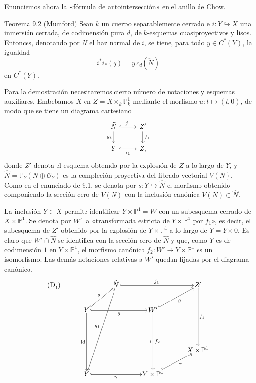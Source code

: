 Enunciemos ahora la «fórmula de autointersección» en el anillo de Chow.

\begin{statement}{Teorema 9.2 (Mumford)}
Sean $k$ un cuerpo separablemente cerrado e $i:Y\hookrightarrow X$ una inmersión cerrada, de codimensión pura $d$, de $k$-esquemas cuasiproyectivos y lisos. Entonces, denotando por $N$ el haz normal de $i$, se tiene, para todo $y\in C^*(Y)$, la igualdad
\[
i^*i_*(y)=y\,c_d(\check N)
\]
en $C^*(Y)$.
\end{statement}

Para la demostración necesitaremos cierto número de notaciones y esquemas auxiliares. Embebamos $X$ en $Z=X\times_k\mathbb P^1_k$ mediante el morfismo $u:t\mapsto(t,0)$, de modo que se tiene un diagrama cartesiano
\[
\begin{tikzcd}
\widehat N \arrow[r,hook,"j_1"] \arrow[d,"g_1"'] & Z' \arrow[d,"f_1"]\\
Y \arrow[r,hook,"i_1"'] & Z ,
\end{tikzcd}
\]
donde $Z'$ denota el esquema obtenido por la explosión de $Z$ a lo largo de $Y$, y $\widehat N=\mathbb P_Y(N\oplus\mathcal O_Y)$ es la compleción proyectiva del fibrado vectorial $V(N)$. Como en el enunciado de 9.1, se denota por $s:Y\hookrightarrow\widehat N$ el morfismo obtenido componiendo la sección cero de $V(N)$ con la inclusión canónica $V(N)\subset\widehat N$.

La inclusión $Y\subset X$ permite identificar $Y\times\mathbb P^1=W$ con un subesquema cerrado de $X\times\mathbb P^1$. Se denota por $W'$ la «transformada estricta de $Y\times\mathbb P^1$ por $f_1$», es decir, el subesquema de $Z'$ obtenido por la explosión de $Y\times\mathbb P^1$ a lo largo de $Y=Y\times0$. Es claro que $W'\cap\widehat N$ se identifica con la sección cero de $\widehat N$ y que, como $Y$ es de codimensión $1$ en $Y\times\mathbb P^1$, el morfismo canónico $f_2:W'\to Y\times\mathbb P^1$ es un isomorfismo. Las demás notaciones relativas a $W'$ quedan fijadas por el diagrama canónico.
\[
\begin{tikzcd}[column sep=3.2em,row sep=2.4em,cells={nodes={inner sep=1pt}}]
\text{(D}_1\text{)}\arrow[from=1-3,to=5-2,"g_1"']
& & \widehat N \arrow[rr,hook,"j_1"] & & Z' \arrow[ddd,"f_1"] \\
& Y \arrow[ur,hook,"s"] \arrow[rr,hook,"\delta"'] \arrow[ddd,"\mathrm{id}"'] & &
W' \arrow[ur,hook,"\beta"'] \arrow[ddd,"\wr"',"f_2"] & \\
& & & & \\
& & & & X\times\mathbb P^1 \\
& Y \arrow[rr,hook,"\gamma"'] & & Y\times\mathbb P^1 \arrow[ur,hook,"\alpha"'] &
\end{tikzcd}
\]

